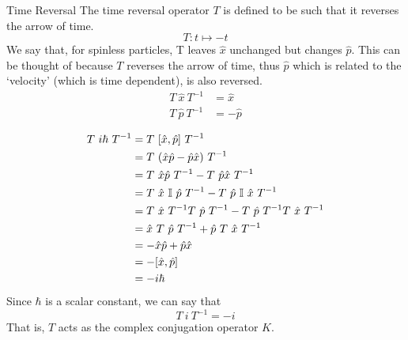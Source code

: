 \documentclass[12pt, oneside, listof=totoc,dvipsnames]{scrbook}
\begin{document}
	
	\begin{chapter}{Time Reversal}
		The time reversal operator $T$ is defined to be such that it reverses the arrow of time. 
		$$T: t \mapsto -t$$
		We say that, for spinless particles, T leaves $\hat{x}$ unchanged but changes $\hat{p}$. This can be thought of because $T$ reverses the arrow of time, thus $\hat{p}$ which is related to the `velocity' (which is time dependent), is also reversed. 
		\begin{align*}
			T\ \hat{x}\ T^{-1}&=\hat{x}\\
			T\ \hat{p}\ T^{-1}&=-\hat{p}
		\end{align*}
		
		\begin{align*}
			T\ i \hbar \ T^{-1}&= T\ [\hat{x}, \hat{p}]\ T^{-1}\\
			&=T \ (\op{x}\op{p}- \op{p}\op{x}) \ T^{-1}\\
			&= T\  \op{x}\op{p}\ T^{-1}- T \ \op{p}\op{x} \ T^{-1}\\
			&= T\  \op{x}\ \mathbb{I}\ \op{p}\ T^{-1}- T \ \op{p}\ \mathbb{I}\ \op{x} \ T^{-1}\\
			&= T\  \op{x}\ T^{-1} T\ \op{p}\ T^{-1}- T \ \op{p}\  T^{-1}T \ \op{x} \ T^{-1}\\
			&= \op{x} \ T\ \op{p}\ T^{-1}+\op{p} \ T\ \op{x} \ T^{-1}\\
			&= -\op{x}\op{p}+\op{p} \op{x}\\
			&=-[\op{x},\op{p}]\\
			&= -i\hbar
		\end{align*}
		Since $\hbar$ is a scalar constant, we can say that $$\boxed{T \ i \ T^{-1} = -i}$$ That is, $T$ acts as the complex conjugation operator $K$. 
		

\end{chapter}
\end{document}
